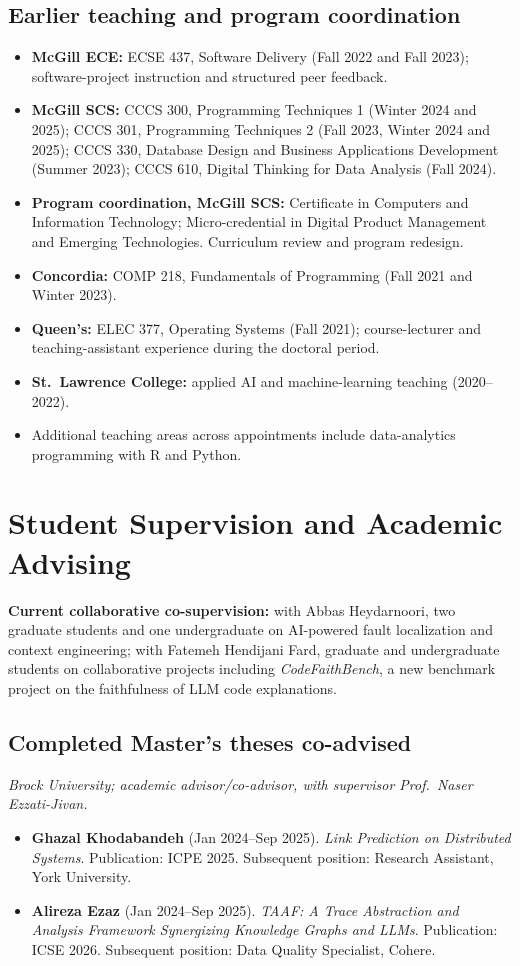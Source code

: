 \documentclass[10pt,letterpaper]{article}
\begin{document}
\subsection{Earlier teaching and program coordination}
\begin{itemize}
\item \textbf{McGill ECE:} ECSE 437, Software Delivery (Fall 2022 and Fall 2023); software-project instruction and structured peer feedback.
\item \textbf{McGill SCS:} CCCS 300, Programming Techniques 1 (Winter 2024 and 2025); CCCS 301, Programming Techniques 2 (Fall 2023, Winter 2024 and 2025); CCCS 330, Database Design and Business Applications Development (Summer 2023); CCCS 610, Digital Thinking for Data Analysis (Fall 2024).
\item \textbf{Program coordination, McGill SCS:} Certificate in Computers and Information Technology; Micro-credential in Digital Product Management and Emerging Technologies. Curriculum review and program redesign.
\item \textbf{Concordia:} COMP 218, Fundamentals of Programming (Fall 2021 and Winter 2023).
\item \textbf{Queen's:} ELEC 377, Operating Systems (Fall 2021); course-lecturer and teaching-assistant experience during the doctoral period.
\item \textbf{St.\ Lawrence College:} applied AI and machine-learning teaching (2020--2022).
\item Additional teaching areas across appointments include data-analytics programming with R and Python.
\end{itemize}

\section{Student Supervision and Academic Advising}
\textbf{Current collaborative co-supervision:} with Abbas Heydarnoori, two graduate students and one undergraduate on AI-powered fault localization and context engineering; with Fatemeh Hendijani Fard, graduate and undergraduate students on collaborative projects including \emph{CodeFaithBench}, a new benchmark project on the faithfulness of LLM code explanations.

\subsection{Completed Master's theses co-advised}
\textit{Brock University; academic advisor/co-advisor, with supervisor Prof.\ Naser Ezzati-Jivan.}
\begin{itemize}
\item \textbf{Ghazal Khodabandeh} (Jan 2024--Sep 2025). \emph{Link Prediction on Distributed Systems}. Publication: ICPE 2025. Subsequent position: Research Assistant, York University.
\item \textbf{Alireza Ezaz} (Jan 2024--Sep 2025). \emph{TAAF: A Trace Abstraction and Analysis Framework Synergizing Knowledge Graphs and LLMs}. Publication: ICSE 2026. Subsequent position: Data Quality Specialist, Cohere.
\end{itemize}
\end{document}

